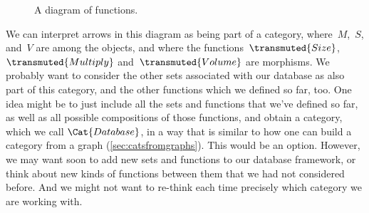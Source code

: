 

\begin{figure}[h!]
    \begin{center}
    \end{center}
    \caption{A diagram of functions. \label{fig:diagram_functions}}
\end{figure}

We can interpret arrows in this diagram as being part of a category, where~$M$,~$S$, and~$V$ are among the objects, and where the functions~$\transmuted{Size}$, $\transmuted{Multiply}$ and~$\transmuted{Volume}$ are morphisms. We probably want to consider the other sets associated with our database as also part of this category, and the other functions which we defined so far, too. One idea might be to just include all the sets and functions that we've defined so far, as well as all possible compositions of those functions, and obtain a category, which we call $\Cat{Database}$, in a way that is similar to how one can build a category from a graph (\cref{sec:catsfromgraphs}). This would be an option. However, we may want soon to add new sets and functions to our database framework, or think about new kinds of functions between them that we had not considered before. And we might not want to re-think each time precisely which category we are working with.
